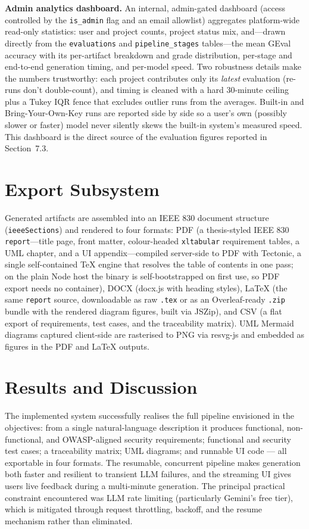 \documentclass[12pt,a4paper,oneside]{report}
\begin{document}
\textbf{Admin analytics dashboard.} An internal, admin-gated dashboard (access controlled by the \texttt{is\_admin} flag and an email allowlist) aggregates platform-wide read-only statistics: user and project counts, project status mix, and---drawn directly from the \texttt{evaluations} and \texttt{pipeline\_stages} tables---the mean GEval accuracy with its per-artifact breakdown and grade distribution, per-stage and end-to-end generation timing, and per-model speed. Two robustness details make the numbers trustworthy: each project contributes only its \emph{latest} evaluation (re-runs don't double-count), and timing is cleaned with a hard 30-minute ceiling plus a Tukey IQR fence that excludes outlier runs from the averages. Built-in and Bring-Your-Own-Key runs are reported side by side so a user's own (possibly slower or faster) model never silently skews the built-in system's measured speed. This dashboard is the direct source of the evaluation figures reported in Section~7.3.

\section{Export Subsystem}
Generated artifacts are assembled into an IEEE 830 document structure (\texttt{ieeeSections}) and rendered to four formats: PDF (a thesis-styled IEEE 830 \texttt{report}---title page, front matter, colour-headed \texttt{xltabular} requirement tables, a UML chapter, and a UI appendix---compiled server-side to PDF with Tectonic, a single self-contained TeX engine that resolves the table of contents in one pass; on the plain Node host the binary is self-bootstrapped on first use, so PDF export needs no container), DOCX (docx.js with heading styles), LaTeX (the same \texttt{report} source, downloadable as raw \texttt{.tex} or as an Overleaf-ready \texttt{.zip} bundle with the rendered diagram figures, built via JSZip), and CSV (a flat export of requirements, test cases, and the traceability matrix). UML Mermaid diagrams captured client-side are rasterised to PNG via resvg-js and embedded as figures in the PDF and LaTeX outputs.

\section{Results and Discussion}
The implemented system successfully realises the full pipeline envisioned in the objectives: from a single natural-language description it produces functional, non-functional, and OWASP-aligned security requirements; functional and security test cases; a traceability matrix; UML diagrams; and runnable UI code --- all exportable in four formats. The resumable, concurrent pipeline makes generation both faster and resilient to transient LLM failures, and the streaming UI gives users live feedback during a multi-minute generation. The principal practical constraint encountered was LLM rate limiting (particularly Gemini's free tier), which is mitigated through request throttling, backoff, and the resume mechanism rather than eliminated.
\end{document}
